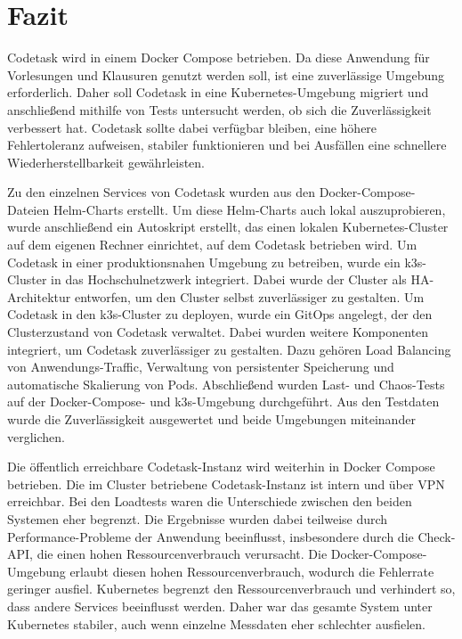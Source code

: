 \chapter{Fazit}

Codetask wird in einem Docker Compose betrieben. Da diese Anwendung für Vorlesungen und Klausuren genutzt werden soll, ist eine zuverlässige Umgebung erforderlich.
Daher soll Codetask in eine Kubernetes-Umgebung migriert und anschließend mithilfe von Tests untersucht werden, ob sich die Zuverlässigkeit verbessert hat.
Codetask sollte dabei verfügbar bleiben, eine höhere Fehlertoleranz aufweisen, stabiler funktionieren und bei Ausfällen eine schnellere Wiederherstellbarkeit gewährleisten.

Zu den einzelnen Services von Codetask wurden aus den Docker-Compose-Dateien Helm-Charts erstellt.
Um diese Helm-Charts auch lokal auszuprobieren, wurde anschließend ein Autoskript erstellt, das einen lokalen Kubernetes-Cluster auf dem eigenen Rechner einrichtet, auf dem Codetask betrieben wird.
Um Codetask in einer produktionsnahen Umgebung zu betreiben, wurde ein k3s-Cluster in das Hochschulnetzwerk integriert. 
Dabei wurde der Cluster als HA-Architektur entworfen, um den Cluster selbst zuverlässiger zu gestalten.
Um Codetask in den k3s-Cluster zu deployen, wurde ein GitOps angelegt, der den Clusterzustand von Codetask verwaltet.
Dabei wurden weitere Komponenten integriert, um Codetask zuverlässiger zu gestalten. Dazu gehören Load Balancing von Anwendungs-Traffic, Verwaltung von persistenter Speicherung und automatische Skalierung von Pods.
Abschließend wurden Last- und Chaos-Tests auf der Docker-Compose- und k3s-Umgebung durchgeführt.
Aus den Testdaten wurde die Zuverlässigkeit ausgewertet und beide Umgebungen miteinander verglichen.

Die öffentlich erreichbare Codetask-Instanz wird weiterhin in Docker Compose betrieben. Die im Cluster betriebene Codetask-Instanz ist intern und über VPN erreichbar.
Bei den Loadtests waren die Unterschiede zwischen den beiden Systemen eher begrenzt. 
Die Ergebnisse wurden dabei teilweise durch Performance-Probleme der Anwendung beeinflusst, insbesondere durch die Check-API, die einen hohen Ressourcenverbrauch verursacht.
Die Docker-Compose-Umgebung erlaubt diesen hohen Ressourcenverbrauch, wodurch die Fehlerrate geringer ausfiel.
Kubernetes begrenzt den Ressourcenverbrauch und verhindert so, dass andere Services beeinflusst werden.
Daher war das gesamte System unter Kubernetes stabiler, auch wenn einzelne Messdaten eher schlechter ausfielen.

